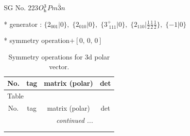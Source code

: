 \documentclass[fleqn,8pt]{jsarticle}
\begin{document}
\setcounter{MaxMatrixCols}{32}

\renewcommand{\tablename}{Table~}
\renewcommand{\figurename}{Figure~}
\begin{center}
\LARGE
SG No. 223\quad$O_{\rm h}^{3}$\quad$Pm\bar{3}n$\quad[ cubic ]
\end{center}

* generator : $\{2{}_{001}|0\},\,\,\{2{}_{010}|0\},\,\,\{3^{+}_{\,\,111}|0\},\,\,\{2{}_{110}|\frac{1}{2} \frac{1}{2} \frac{1}{2}\},\,\,\{-1|0\}$

* symmetry operation\quad$+\left[ 0,\, 0,\, 0 \right]$
\renewcommand{\arraystretch}{1.3}
\begin{longtable}{cccc}
\caption{Symmetry operations for 3d polar vector.}
 \\
 \hline \hline
No. & tag & matrix (polar) & det \\ \hline \endfirsthead

\multicolumn{3}{l}{\tablename\ \thetable{}} \\
 \hline \hline
No. & tag & matrix (polar) & det \\ \hline \endhead

 \hline \hline
\multicolumn{3}{r}{\footnotesize\it continued ...} \\ \endfoot

 \hline \hline
\multicolumn{3}{r}{} \\ \endlastfoot


\end{longtable}
\end{document}
